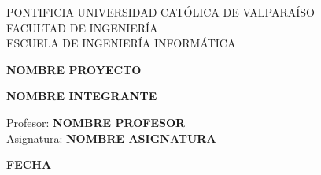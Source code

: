 \begin{center}
PONTIFICIA UNIVERSIDAD CATÓLICA DE VALPARAÍSO\\
FACULTAD DE INGENIERÍA\\
ESCUELA DE INGENIERÍA INFORMÁTICA\\

\vspace{3cm}

\huge{\textbf{NOMBRE PROYECTO}}

\vspace{3cm}

\normalsize{\textbf{NOMBRE INTEGRANTE}}\\

\vspace{3cm}

\large{Profesor: \textbf{NOMBRE PROFESOR}}\\
\large{Asignatura: \textbf{NOMBRE ASIGNATURA}}

\vspace*{\fill}
\textbf{FECHA}
\end{center}